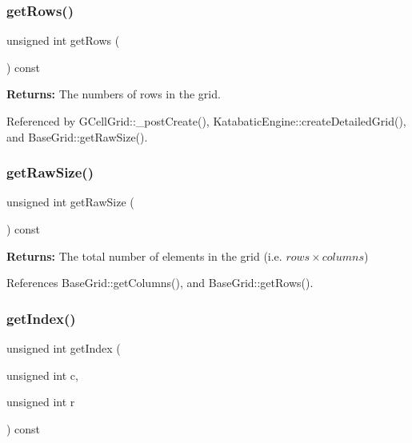 \mbox{\label{classKatabatic_1_1BaseGrid_a4bad6abc58473d953258a3230506291a}} 
\subsubsection{\texorpdfstring{get\+Rows()}{getRows()}}
{\footnotesize\ttfamily unsigned int get\+Rows (\begin{DoxyParamCaption}{ }\end{DoxyParamCaption}) const\hspace{0.3cm}{\ttfamily [inline]}}

{\bfseries Returns\+:} The numbers of rows in the grid. 

Referenced by G\+Cell\+Grid\+::\+\_\+post\+Create(), Katabatic\+Engine\+::create\+Detailed\+Grid(), and Base\+Grid\+::get\+Raw\+Size().

\mbox{\label{classKatabatic_1_1BaseGrid_a47cf844f090417180d0bae098133565e}} 
\subsubsection{\texorpdfstring{get\+Raw\+Size()}{getRawSize()}}
{\footnotesize\ttfamily unsigned int get\+Raw\+Size (\begin{DoxyParamCaption}{ }\end{DoxyParamCaption}) const\hspace{0.3cm}{\ttfamily [inline]}}

{\bfseries Returns\+:} The total number of elements in the grid (i.\+e. $ rows \times columns $) 

References Base\+Grid\+::get\+Columns(), and Base\+Grid\+::get\+Rows().

\mbox{\label{classKatabatic_1_1BaseGrid_aae84726d9984c1df9905fc97d9b34f28}} 
\subsubsection{\texorpdfstring{get\+Index()}{getIndex()}}
{\footnotesize\ttfamily unsigned int get\+Index (\begin{DoxyParamCaption}\item[{unsigned int}]{c,  }\item[{unsigned int}]{r }\end{DoxyParamCaption}) const\hspace{0.3cm}{\ttfamily [inline]}}

